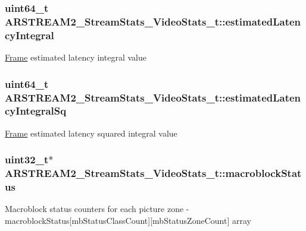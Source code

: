 \subsubsection[{\texorpdfstring{estimated\+Latency\+Integral}{estimatedLatencyIntegral}}]{\setlength{\rightskip}{0pt plus 5cm}uint64\+\_\+t A\+R\+S\+T\+R\+E\+A\+M2\+\_\+\+Stream\+Stats\+\_\+\+Video\+Stats\+\_\+t\+::estimated\+Latency\+Integral}\hypertarget{struct_a_r_s_t_r_e_a_m2___stream_stats___video_stats__t_aef8945662b86e0c75a22c31b641c8be0}{}\label{struct_a_r_s_t_r_e_a_m2___stream_stats___video_stats__t_aef8945662b86e0c75a22c31b641c8be0}
\hyperlink{struct_frame}{Frame} estimated latency integral value 
\subsubsection[{\texorpdfstring{estimated\+Latency\+Integral\+Sq}{estimatedLatencyIntegralSq}}]{\setlength{\rightskip}{0pt plus 5cm}uint64\+\_\+t A\+R\+S\+T\+R\+E\+A\+M2\+\_\+\+Stream\+Stats\+\_\+\+Video\+Stats\+\_\+t\+::estimated\+Latency\+Integral\+Sq}\hypertarget{struct_a_r_s_t_r_e_a_m2___stream_stats___video_stats__t_a8364bbbae42abe35ca544b3a71e7a784}{}\label{struct_a_r_s_t_r_e_a_m2___stream_stats___video_stats__t_a8364bbbae42abe35ca544b3a71e7a784}
\hyperlink{struct_frame}{Frame} estimated latency squared integral value 
\subsubsection[{\texorpdfstring{macroblock\+Status}{macroblockStatus}}]{\setlength{\rightskip}{0pt plus 5cm}uint32\+\_\+t$\ast$ A\+R\+S\+T\+R\+E\+A\+M2\+\_\+\+Stream\+Stats\+\_\+\+Video\+Stats\+\_\+t\+::macroblock\+Status}\hypertarget{struct_a_r_s_t_r_e_a_m2___stream_stats___video_stats__t_a75e0b6772316aee04b98df66e38dcfd7}{}\label{struct_a_r_s_t_r_e_a_m2___stream_stats___video_stats__t_a75e0b6772316aee04b98df66e38dcfd7}
Macroblock status counters for each picture zone -\/ macroblock\+Status\mbox{[}mb\+Status\+Class\+Count\mbox{]}\mbox{[}mb\+Status\+Zone\+Count\mbox{]} array 
